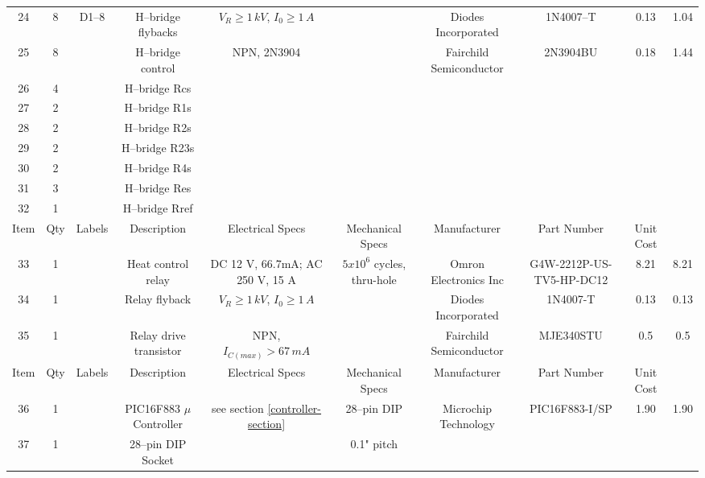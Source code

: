 \documentclass[10pt, twocolumn]{article}
\begin{document}
\begin{center}
\begin{adjustbox}{max width=\textwidth}
\begin{tabular}{c c c c c c c c c c}
24	&8	&D1--8	&H--bridge flybacks	&$V_{R}\geq1\,kV$, $I_{0}\geq 1\,A$	&
	&Diodes Incorporated	&1N4007--T		&0.13		&1.04	\\

25	&8	&	&H--bridge control	&NPN, 2N3904			&
	&Fairchild Semiconductor	&2N3904BU	&0.18		&1.44	\\

26	&4	&	&H--bridge Rcs			&					&
	&			&			&		&	\\

27	&2	&	&H--bridge R1s			&					&
	&			&			&		&	\\

28	&2	&	&H--bridge R2s			&					&
	&			&			&		&	\\

29	&2	&	&H--bridge R23s			&					&
	&			&			&		&	\\

30	&2	&	&H--bridge R4s			&					&
	&			&			&		&	\\

31	&3	&	&H--bridge Res			&					&
	&			&			&		&	\\

32	&1	&	&H--bridge Rref			&					&
	&			&			&		&	\\

\hline
Item	&Qty	&Labels	&Description		&Electrical Specs		&Mechanical Specs
	&Manufacturer		&Part Number		&Unit Cost	&	\\
\hline

33	&1	&	&Heat control relay		&DC 12 V, 66.7mA; AC 250 V, 15 A	&$5x10^6$ cycles, thru-hole
	&Omron Electronics Inc	&G4W-2212P-US-TV5-HP-DC12	&8.21	&8.21	\\

34	&1	&	&Relay flyback			&$V_{R}\geq1\,kV$, $I_{0}\geq1\,A$	&
	&Diodes Incorporated	&1N4007-T			&0.13	&0.13	\\

35	&1	&	&Relay drive transistor		&NPN, $I_{C(max)}>67\,mA$		&
	&Fairchild Semiconductor	&MJE340STU	&0.5		&0.5	\\

\hline
Item	&Qty	&Labels	&Description		&Electrical Specs		&Mechanical Specs
	&Manufacturer		&Part Number		&Unit Cost	&	\\
\hline

36	&1	&	&PIC16F883 $\mu$Controller	&see section \ref{controller-section}	&28--pin DIP
	&Microchip Technology	&PIC16F883-I/SP		&1.90		&1.90	\\

37	&1	&	&28--pin DIP Socket		&					&0.1" pitch
	&		&				&		&	\\


\end{tabular}
\end{adjustbox}
\end{center}
\end{document}
